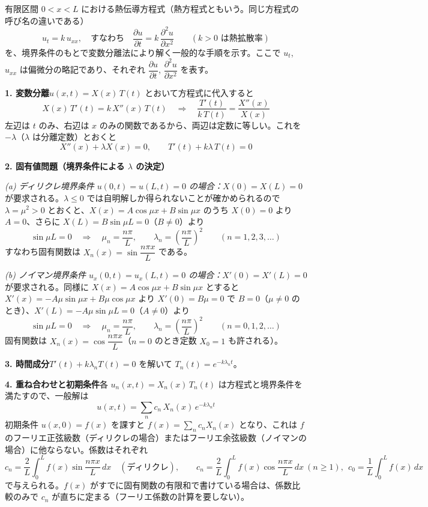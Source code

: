 \documentclass[a4paper,11pt]{article}
\begin{document}


\noindent
有限区間 $0 < x < L$ における熱伝導方程式（熱方程式ともいう。同じ方程式の呼び名の違いである）
\[
u_t = k\,u_{xx},
\quad\text{すなわち}\quad
\frac{\partial u}{\partial t} = k\,\frac{\partial^{2} u}{\partial x^{2}}
\qquad (k > 0 \text{ は熱拡散率})
\]
を、境界条件のもとで変数分離法により解く一般的な手順を示す。ここで $u_t$, $u_{xx}$ は偏微分の略記であり、それぞれ $\dfrac{\partial u}{\partial t}$, $\dfrac{\partial^{2} u}{\partial x^{2}}$ を表す。

\medskip\noindent
\textbf{1. 変数分離}\quad $u(x,t) = X(x)\,T(t)$ とおいて方程式に代入すると
\[
X(x)\,T'(t) = k\,X''(x)\,T(t)
\quad\Longrightarrow\quad
\frac{T'(t)}{k\,T(t)} = \frac{X''(x)}{X(x)}
\]
左辺は $t$ のみ、右辺は $x$ のみの関数であるから、両辺は定数に等しい。これを $-\lambda$（$\lambda$ は分離定数）とおくと
\[
X''(x) + \lambda X(x) = 0, \qquad T'(t) + k\lambda\,T(t) = 0
\]

\medskip\noindent
\textbf{2. 固有値問題（境界条件による $\lambda$ の決定）}

\noindent
\textit{(a) ディリクレ境界条件 $u(0,t) = u(L,t) = 0$ の場合：}\quad $X(0) = X(L) = 0$ が要求される。$\lambda \le 0$ では自明解しか得られないことが確かめられるので $\lambda = \mu^2 > 0$ とおくと、$X(x) = A\cos\mu x + B\sin\mu x$ のうち $X(0)=0$ より $A=0$、さらに $X(L) = B\sin\mu L = 0$（$B \neq 0$）より
\[
\sin\mu L = 0 \quad\Longrightarrow\quad \mu_n = \frac{n\pi}{L}, \qquad \lambda_n = \left(\frac{n\pi}{L}\right)^{2} \qquad (n = 1, 2, 3, \dots)
\]
すなわち固有関数は $X_n(x) = \sin\dfrac{n\pi x}{L}$ である。

\noindent
\textit{(b) ノイマン境界条件 $u_x(0,t) = u_x(L,t) = 0$ の場合：}\quad $X'(0) = X'(L) = 0$ が要求される。同様に $X(x) = A\cos\mu x + B\sin\mu x$ とすると $X'(x) = -A\mu\sin\mu x + B\mu\cos\mu x$ より $X'(0) = B\mu = 0$ で $B = 0$（$\mu \neq 0$ のとき）、$X'(L) = -A\mu\sin\mu L = 0$（$A \neq 0$）より
\[
\sin\mu L = 0 \quad\Longrightarrow\quad \mu_n = \frac{n\pi}{L}, \qquad \lambda_n = \left(\frac{n\pi}{L}\right)^{2} \qquad (n = 0, 1, 2, \dots)
\]
固有関数は $X_n(x) = \cos\dfrac{n\pi x}{L}$（$n=0$ のとき定数 $X_0 = 1$ も許される）。

\medskip\noindent
\textbf{3. 時間成分}\quad $T'(t) + k\lambda_n T(t) = 0$ を解いて $T_n(t) = e^{-k\lambda_n t}$。

\medskip\noindent
\textbf{4. 重ね合わせと初期条件}\quad 各 $u_n(x,t) = X_n(x)\,T_n(t)$ は方程式と境界条件を満たすので、一般解は
\[
u(x,t) = \sum_{n} c_n\,X_n(x)\,e^{-k\lambda_n t}
\]
初期条件 $u(x,0) = f(x)$ を課すと $f(x) = \sum_n c_n X_n(x)$ となり、これは $f$ のフーリエ正弦級数（ディリクレの場合）またはフーリエ余弦級数（ノイマンの場合）に他ならない。係数はそれぞれ
\[
c_n = \frac{2}{L}\int_0^L f(x)\sin\frac{n\pi x}{L}\,dx \quad(\text{ディリクレ}), \qquad
c_n = \frac{2}{L}\int_0^L f(x)\cos\frac{n\pi x}{L}\,dx\ (n\ge1),\ \ c_0 = \frac{1}{L}\int_0^L f(x)\,dx
\]
で与えられる。$f(x)$ がすでに固有関数の有限和で書けている場合は、係数比較のみで $c_n$ が直ちに定まる（フーリエ係数の計算を要しない）。
\end{document}
